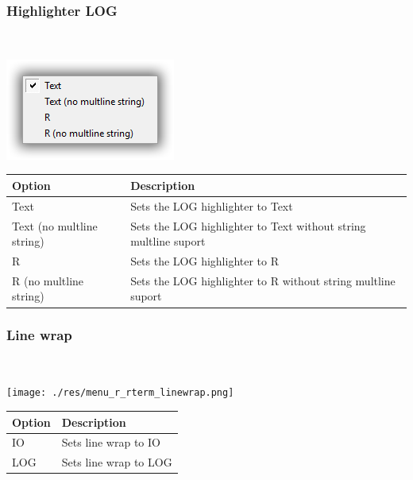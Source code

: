 \hypertarget{menu_r_rterm_highlighter_Log}{}
\subsubsection{Highlighter LOG}\\

\includegraphics[scale=0.50]{./res/menu_r_rterm_highlighter_log.png}\\

\begin{scriptsize}
  \begin{tabularx}{\textwidth}{>{\hsize=0.3\hsize}X>{\hsize=0.7\hsize}X}\\
    \hline
    \textbf{Option} & \textbf{Description} \\
    \hline
    Text & Sets the LOG highlighter to Text \\
    Text (no multline string) & Sets the LOG highlighter to Text without string multline suport \\
    R & Sets the LOG highlighter to R \\
    R (no multline string) & Sets the LOG highlighter to R without string multline suport \\
    \hline
  \end{tabularx}
\end{scriptsize}


\newpage
\hypertarget{menu_r_rterm_linewrap}{}
\subsubsection{Line wrap}\\

\texttt{[image: ./res/menu\_r\_rterm\_linewrap.png]}\\

\begin{scriptsize}
  \begin{tabularx}{\textwidth}{>{\hsize=0.3\hsize}X>{\hsize=0.7\hsize}X}\\
    \hline
    \textbf{Option} & \textbf{Description} \\
    \hline
    IO & Sets line wrap to IO \\
    LOG & Sets line wrap to LOG \\
    \hline
  \end{tabularx}
\end{scriptsize}


